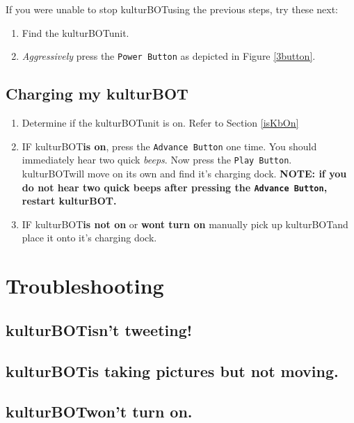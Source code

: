 \documentclass[]{article}
\newcommand{\kb}{kulturBOT}
\newcommand{\kbspace}{\kb \space}
\newcommand{\mykb}{my \kb}
\begin{document}
If you were unable to stop \kbspace using the previous steps, try these next:

\begin{enumerate}
\item Find the \kbspace unit.
\item \textit{Aggressively} press the \texttt{Power Button} as depicted in Figure \ref{3button}.
\end{enumerate}

\subsection{Charging \mykb}
\label{chargingKB}

\begin{enumerate}
\item Determine if the \kb unit is on. Refer to Section \ref{isKbOn}
\item IF \kbspace \textbf{is on}, press the \texttt{Advance Button} one time. You should immediately hear two quick \textit{beeps}. Now press the \texttt{Play Button}. \kbspace will move on its own and find it's charging dock.
\subitem \textbf{NOTE: if you do not hear two quick beeps after pressing the \texttt{Advance Button}, restart \kb.}
\item IF \kbspace \textbf{is not on} or \textbf{wont turn on} manually pick up \kbspace and place it onto it's charging dock.
\end{enumerate}

\section{Troubleshooting}
\subsection{\kbspace isn't tweeting!}
\label{kbNoTweet}

\subsection{\kbspace is taking pictures but not moving.}
\subsection{\kbspace won't turn on.}
\end{document}
